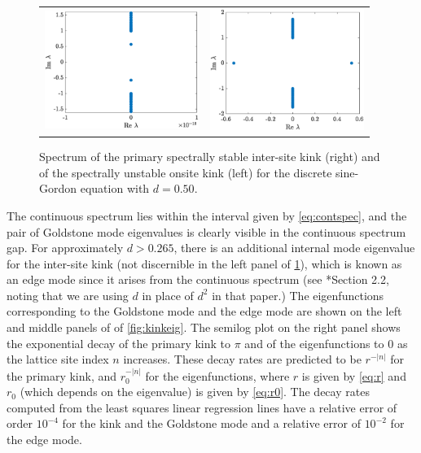 \documentclass[12pt,reqno]{amsart}
\begin{document}
\begin{figure}
\begin{center}
\begin{tabular}{cc}
\includegraphics[width=5cm]{1kinkspectrum.eps}	&
\includegraphics[width=5cm]{1kinkonsitespectrum.eps}
\end{tabular}
\end{center}
\caption{Spectrum of the primary spectrally stable 
inter-site kink (right) and of the spectrally unstable 
onsite kink (left) for the discrete sine-Gordon equation with $d = 0.50$.}
\label{fig:kinkspec}
\end{figure}

The continuous spectrum lies within the interval given by \cref{eq:contspec}, and the pair of Goldstone mode eigenvalues is clearly visible in the continuous spectrum gap. For approximately $d > 0.265$, there is an additional internal mode eigenvalue for the inter-site kink (not discernible in the left panel of \cref{fig:kinkspec}), which is known as an edge mode since it arises from the continuous spectrum (see \cite{KevrekidisWeinstein2000}*{Section 2.2}, noting that we are using $d$ in place of $d^2$ in that paper.) The eigenfunctions corresponding to the Goldstone mode and the edge mode are shown on the left and middle panels of of \cref{fig:kinkeig}. The semilog plot on the right panel shows the exponential decay of the primary kink to $\pi$ and of the eigenfunctions to 0 as the lattice site index $n$ increases. These decay rates are predicted to be $r^{-|n|}$ for the primary kink, and $r_0^{-|n|}$ for the eigenfunctions, where $r$ is given by \cref{eq:r} and $r_0$ (which depends on the eigenvalue) is given by \cref{eq:r0}. The decay rates computed from the least squares linear regression lines have a relative error of order $10^{-4}$ for the kink and the Goldstone mode and a relative error of $10^{-2}$ for the edge mode.
\end{document}
